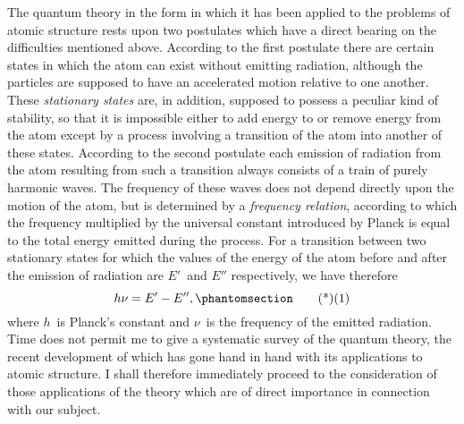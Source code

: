  The quantum theory
in the form in which it has been applied to the problems of atomic
structure rests upon two postulates which have a direct bearing
on the difficulties mentioned above. According to the first postulate
there are certain states in which the atom can exist without
emitting radiation, although the particles are supposed to have an
accelerated motion relative to one another. These \emph{stationary states}
are, in addition, supposed to possess a peculiar kind of stability, so
that it is impossible either to add energy to or remove energy from
the atom except by a process involving a transition of the atom
into another of these states. According to the second postulate
each emission of radiation from the atom resulting from such a
transition always consists of a train of purely harmonic waves.
The frequency of these waves does not depend directly upon the
motion of the atom, but is determined by a \emph{frequency relation},
according to which the frequency multiplied by the universal constant
introduced by Planck is equal to the total energy emitted
during the process. For a transition between two stationary states
for which the values of the energy of the atom before and after the
emission of radiation are $E'$~and $E''$ respectively, we have therefore
\[
h\nu = E' - E'',
\Tag{(1)}
\]
where $h$~is Planck's constant and $\nu$~is the frequency of the emitted
radiation. Time does not permit me to give a systematic survey
of the quantum theory, the recent development of which has gone
hand in hand with its applications to atomic structure. I shall
therefore immediately proceed to the consideration of those applications
of the theory which are of direct importance in connection
with our subject.

